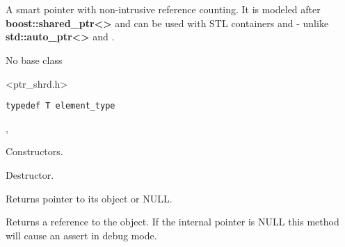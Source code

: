 \section{}\label{wxsharedptr}

A smart pointer with non-intrusive reference counting. It is modeled
after {\bf boost::shared\_ptr<>} and can be used with STL containers 
and  - unlike {\bf std::auto\_ptr<>}
and .


No base class


<ptr\_shrd.h>


{\small%
\begin{verbatim}
typedef T element_type
\end{verbatim}
}%


, 




\label{wxsharedptrwxsharedptr}



Constructors.

\label{wxsharedptrdtor}


Destructor.

\label{wxsharedptrget}


Returns pointer to its object or NULL.

\label{wxsharedptroperatorreft}


Returns a reference to the object. If the internal pointer is NULL this
method will cause an assert in debug mode.

\label{wxsharedptroperatorderef}

